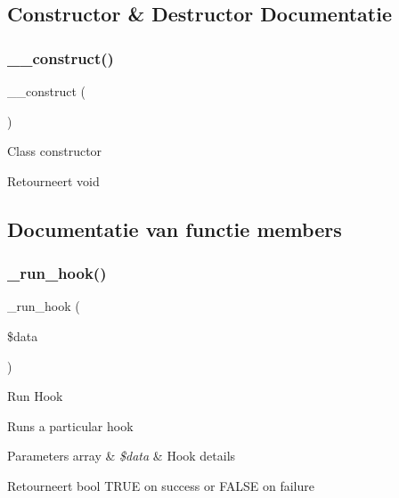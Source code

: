\subsection{Constructor \& Destructor Documentatie}
\mbox{\label{class_c_i___hooks_a095c5d389db211932136b53f25f39685}} 
\subsubsection{\texorpdfstring{\_\_construct()}{\_\_construct()}}
{\footnotesize\ttfamily \+\_\+\+\_\+construct (\begin{DoxyParamCaption}{ }\end{DoxyParamCaption})}

Class constructor

\begin{DoxyReturn}{Retourneert}
void 
\end{DoxyReturn}


\subsection{Documentatie van functie members}
\mbox{\label{class_c_i___hooks_a2cd07b3fcfaf153a37f164d3fbc7c3d9}} 
\subsubsection{\texorpdfstring{\_run\_hook()}{\_run\_hook()}}
{\footnotesize\ttfamily \+\_\+run\+\_\+hook (\begin{DoxyParamCaption}\item[{}]{\$data }\end{DoxyParamCaption})\hspace{0.3cm}{\ttfamily [protected]}}

Run Hook

Runs a particular hook


\begin{DoxyParams}[1]{Parameters}
array & {\em \$data} & Hook details \\
\hline
\end{DoxyParams}
\begin{DoxyReturn}{Retourneert}
bool T\+R\+UE on success or F\+A\+L\+SE on failure 
\end{DoxyReturn}
\mbox{\label{class_c_i___hooks_a470d397aaf24f1ca3ef73021ad03492b}} 
